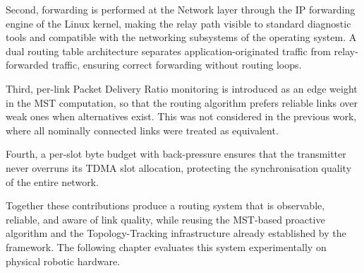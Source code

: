 Second, forwarding is performed at the Network layer through the IP forwarding engine
of the Linux kernel, making the relay path visible to standard diagnostic tools and
compatible with the networking subsystems of the operating system. A dual routing table
architecture separates application-originated traffic from relay-forwarded traffic, ensuring
correct forwarding without routing loops.

Third, per-link Packet Delivery Ratio monitoring is introduced as an edge weight in the
MST computation, so that the routing algorithm prefers reliable links over weak ones when
alternatives exist. This was not considered in the previous work, where all nominally
connected links were treated as equivalent.

Fourth, a per-slot byte budget with back-pressure ensures that the transmitter never
overruns its TDMA slot allocation, protecting the synchronisation quality of the entire
network.

Together these contributions produce a routing system that is observable, reliable, and
aware of link quality, while reusing the MST-based proactive algorithm and the
Topology-Tracking infrastructure already established by the framework. The following
chapter evaluates this system experimentally on physical robotic hardware.
